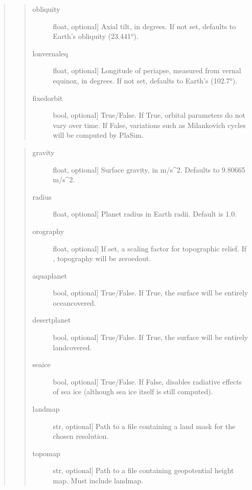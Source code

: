 \documentclass[letterpaper,10pt,english]{sphinxmanual}
\begin{document}
\begin{fulllineitems}
\begin{fulllineitems}
\begin{quote}
\begin{quote}
\begin{description}
\item[{obliquity}] \leavevmode{[}float, optional{]}
Axial tilt, in degrees. If not set, defaults to Earth’s obliquity (23.441°).

\item[{lonvernaleq}] \leavevmode{[}float, optional{]}
Longitude of periapse, measured from vernal equinox, in degrees. If
not set, defaults to Earth’s (102.7°).

\item[{fixedorbit}] \leavevmode{[}bool, optional{]}
True/False. If True, orbital parameters do not vary over time. If False,
variations such as Milankovich cycles will be computed by PlaSim.

\end{description}
\end{quote}

\begin{quote}
\begin{description}
\item[{gravity}] \leavevmode{[}float, optional{]}
Surface gravity, in m/s\textasciicircum{}2. Defaults to 9.80665 m/s\textasciicircum{}2.

\item[{radius}] \leavevmode{[}float, optional{]}
Planet radius in Earth radii. Default is 1.0.

\item[{orography}] \leavevmode{[}float, optional{]}
If set, a scaling factor for topographic relief. If , topography
will be zeroed\sphinxhyphen{}out.

\item[{aquaplanet}] \leavevmode{[}bool, optional{]}
True/False. If True, the surface will be entirely ocean\sphinxhyphen{}covered.

\item[{desertplanet}] \leavevmode{[}bool, optional{]}
True/False. If True, the surface will be entirely land\sphinxhyphen{}covered.

\item[{seaice}] \leavevmode{[}bool, optional{]}
True/False. If False, disables radiative effects of sea ice (although sea ice
itself is still computed).

\item[{landmap}] \leavevmode{[}str, optional{]}
Path to a  file containing a land mask for the chosen resolution.

\item[{topomap}] \leavevmode{[}str, optional{]}
Path to a  file containing geopotential height map. Must include landmap.


\end{description}
\end{quote}
\end{quote}
\end{fulllineitems}
\end{fulllineitems}
\end{document}

